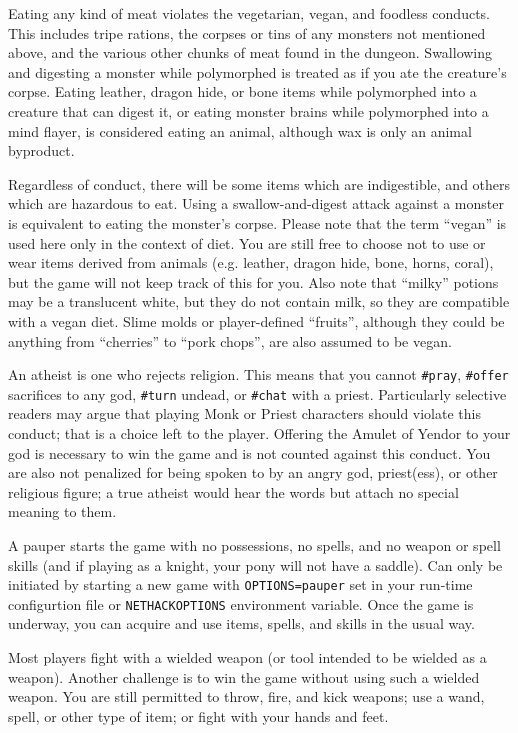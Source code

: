 \documentclass[titlepage]{article}
\begin{document}
Eating any kind of meat violates the vegetarian, vegan, and foodless
conducts.  This includes tripe rations, the corpses or tins of any
monsters not mentioned above, and the various other chunks of meat
found in the dungeon.  Swallowing and digesting a monster while polymorphed
is treated as if you ate the creature's corpse.
Eating leather, dragon hide, or bone items while
polymorphed into a creature that can digest it, or eating monster brains
while polymorphed into a mind flayer, is considered eating
an animal, although wax is only an animal byproduct.

Regardless of conduct, there will be some items which are indigestible,
and others which are hazardous to eat.  Using a swallow-and-digest
attack against a monster is equivalent to eating the monster's corpse.
Please note that the term ``vegan'' is used here only in the context of
diet.  You are still free to choose not to use or wear items derived
from animals (e.g. leather, dragon hide, bone, horns, coral), but the
game will not keep track of this for you.  Also note that ``milky''
potions may be a translucent white, but they do not contain milk,
so they are compatible with a vegan diet.  Slime molds or
player-defined ``fruits'', although they could be anything
from ``cherries'' to ``pork chops'', are also assumed to be vegan.

An atheist is one who rejects religion.  This means that you cannot
\texttt{\#pray}, \texttt{\#offer} sacrifices to any god,
\texttt{\#turn} undead, or \texttt{\#chat} with a priest.
Particularly selective readers may argue that playing Monk or Priest
characters should violate this conduct; that is a choice left to the
player.  Offering the Amulet of Yendor to your god is necessary to
win the game and is not counted against this conduct.  You are also
not penalized for being spoken to by an angry god, priest(ess), or
other religious figure; a true atheist would hear the words but
attach no special meaning to them.

A pauper starts the game with no possessions, no spells, and no weapon or
spell skills (and if playing as a knight, your pony will not have a saddle).
Can only be initiated by starting a new game with \texttt{OPTIONS=pauper}
set in your run-time configurtion file or \texttt{NETHACKOPTIONS} environment
variable.
Once the game is underway, you can acquire and use items, spells, and skills
in the usual way.

Most players fight with a wielded weapon (or tool intended to be
wielded as a weapon).  Another challenge is to win the game without
using such a wielded weapon.  You are still permitted to throw,
fire, and kick weapons; use a wand, spell, or other type of item;
or fight with your hands and feet.
\end{document}
